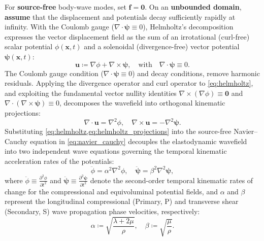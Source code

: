 For \textbf{source-free} body-wave modes, set $\mathbf{f} = \mathbf{0}$. On an
\textbf{unbounded domain}, \textbf{assume} that the displacement and potentials
decay sufficiently rapidly at infinity. With the Coulomb gauge
($\nabla \cdot \bm{\psi} \equiv 0$), Helmholtz's decomposition expresses the
vector displacement field as the sum of an irrotational (curl-free) scalar
potential $\phi(\mathbf{x}, t)$ and a solenoidal (divergence-free) vector
potential $\bm{\psi}(\mathbf{x}, t)$:
\begin{equation}
  \mathbf{u} \coloneqq \nabla \phi + \nabla \times \bm{\psi}, \quad
  \text{with} \quad \nabla \cdot \bm{\psi} \equiv 0.
  \label{eq:helmholtz}
\end{equation}
The Coulomb gauge condition ($\nabla \cdot \bm{\psi} \equiv 0$) and decay
conditions, remove harmonic residuals. Applying the divergence operator
and curl operator to \cref{eq:helmholtz}, and exploiting the fundamental vector
nullity identities $\nabla \times (\nabla \phi) \equiv \mathbf{0}$ and
$\nabla \cdot (\nabla \times \bm{\psi}) \equiv 0$, decomposes the wavefield
into orthogonal kinematic projections:
\begin{equation}
  \nabla \cdot \mathbf{u} = \nabla^2 \phi, \quad
  \nabla \times \mathbf{u} = -\nabla^2 \bm{\psi}.
  \label{eq:helmholtz_projections}
\end{equation}
Substituting \cref{eq:helmholtz,eq:helmholtz_projections} into the source-free
Navier--Cauchy equation in \cref{eq:navier_cauchy} decouples the elastodynamic
wavefield into two independent wave equations governing the temporal kinematic
acceleration rates of the potentials:
\begin{equation}
  \ddot{\phi} = \alpha^2 \nabla^2 \phi, \quad
  \ddot{\bm{\psi}} = \beta^2 \nabla^2 \bm{\psi},
  \label{eq:decoupled_wave_equations}
\end{equation}
where $\ddot{\phi} \equiv \frac{\partial^2 \phi}{\partial t^2}$ and
$\ddot{\bm{\psi}} \equiv \frac{\partial^2 \bm{\psi}}{\partial t^2}$ denote the
second-order temporal kinematic rates of change for the compressional and
equivoluminal potential fields, and $\alpha$ and $\beta$ represent the
longitudinal compressional (Primary, P) and transverse shear (Secondary, S)
wave propagation phase velocities, respectively:
\begin{equation}
  \alpha \coloneqq \sqrt{\frac{\lambda + 2\mu}{\rho}}, \quad \beta \coloneqq
  \sqrt{\frac{\mu}{\rho}}.
  \label{eq:wave_velocities}
\end{equation}


